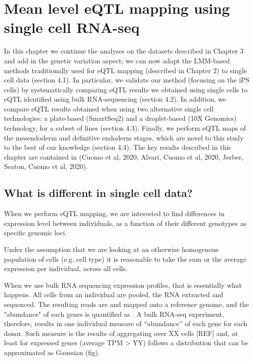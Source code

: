 
\chapter{Mean level eQTL mapping using single cell RNA-seq}

In this chapter we continue the analyses on the datasets described in Chapter 3 and add in the genetic variation aspect; we can now adapt the LMM-based methods traditionally used for eQTL mapping (described in Chapter 2) to single cell data (section 4.1). In particular, we validate our method (focusing on the iPS cells) by systematically comparing eQTL results we obtained using single cells to eQTL identified using bulk RNA-sequencing (section 4.2). In addition, we compare eQTL results obtained when using two alternative single cell technologies: a plate-based (SmartSeq2) and a droplet-based (10X Genomics) technology, for a subset of lines (section 4.3). Finally, we perform eQTL maps of the mesendoderm and definitive endoderm stages, which are novel to this study to the best of our knowledge (section 4.4). The key results described in this chapter are contained in (Cuomo et al, 2020, Alvari, Cuomo et al, 2020, Jerber, Seaton, Cuomo et al, 2020).

\section{What is different in single cell data?}

When we perform eQTL mapping, we are interested to find differences in expression level between individuals, as a function of their different genotypes as specific genomic loci. 

Under the assumption that we are looking at an otherwise homogenous population of cells (e.g. cell type) it is reasonable to take the sum or the average expression per individual, across all cells.

When we use bulk RNA sequencing expression profiles, that is essentially what happens. All cells from an individual are pooled, the RNA extracted and sequenced. 
The resulting reads are and mapped onto a reference genome, and the "abundance" of each genes is quantified as . A bulk RNA-seq experiment, therefore, results in one individual measure of “abundance” of each gene for each donor. Such measure is the results of aggregating over XX cells [REF] and, at least for expressed genes (average TPM > YY) follows a distribution that can be approximated as Gaussian (fig).

